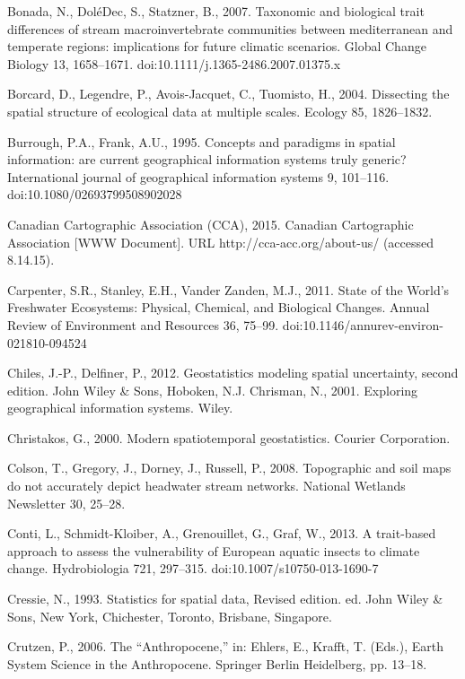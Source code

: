 \begin{thebibliography}
\bibitem{} \hangindent=1cm Bonada, N., DoléDec, S., Statzner, B., 2007. Taxonomic and biological trait differences of stream macroinvertebrate communities between mediterranean and temperate regions: implications for future climatic scenarios. Global Change Biology 13, 1658–1671. doi:10.1111/j.1365-2486.2007.01375.x

\bibitem{} \hangindent=1cm Borcard, D., Legendre, P., Avois-Jacquet, C., Tuomisto, H., 2004. Dissecting the spatial structure of ecological data at multiple scales. Ecology 85, 1826–1832.

\bibitem{} \hangindent=1cm Burrough, P.A., Frank, A.U., 1995. Concepts and paradigms in spatial information: are current geographical information systems truly generic? International journal of geographical information systems 9, 101–116. doi:10.1080/02693799508902028

\bibitem{} \hangindent=1cm Canadian Cartographic Association (CCA), 2015. Canadian Cartographic Association [WWW Document]. URL http://cca-acc.org/about-us/ (accessed 8.14.15).

\bibitem{} \hangindent=1cm Carpenter, S.R., Stanley, E.H., Vander Zanden, M.J., 2011. State of the World’s Freshwater Ecosystems: Physical, Chemical, and Biological Changes. Annual Review of Environment and Resources 36, 75–99. doi:10.1146/annurev-environ-021810-094524

\bibitem{} \hangindent=1cm Chiles, J.-P., Delfiner, P., 2012. Geostatistics modeling spatial uncertainty, second edition. John Wiley & Sons, Hoboken, N.J.
Chrisman, N., 2001. Exploring geographical information systems. Wiley.

\bibitem{} \hangindent=1cm Christakos, G., 2000. Modern spatiotemporal geostatistics. Courier Corporation.

\bibitem{} \hangindent=1cm Colson, T., Gregory, J., Dorney, J., Russell, P., 2008. Topographic and soil maps do not accurately depict headwater stream networks. National Wetlands Newsletter 30, 25–28.

\bibitem{} \hangindent=1cm Conti, L., Schmidt-Kloiber, A., Grenouillet, G., Graf, W., 2013. A trait-based approach to assess the vulnerability of European aquatic insects to climate change. Hydrobiologia 721, 297–315. doi:10.1007/s10750-013-1690-7

\bibitem{} \hangindent=1cm Cressie, N., 1993. Statistics for spatial data, Revised edition. ed. John Wiley & Sons, New York, Chichester, Toronto, Brisbane, Singapore.

\bibitem{} \hangindent=1cm Crutzen, P., 2006. The “Anthropocene,” in: Ehlers, E., Krafft, T. (Eds.), Earth System Science in the Anthropocene. Springer Berlin Heidelberg, pp. 13–18.


\end{thebibliography}
